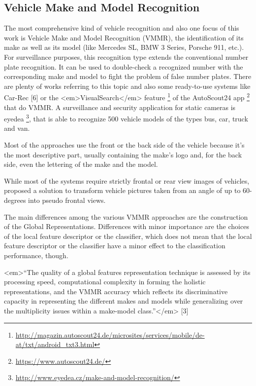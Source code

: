 \subsection{Vehicle Make and Model Recognition}\label{sec:vmmrStateOfTheArt}
The most comprehensive kind of vehicle recognition and also one focus of this work is Vehicle Make and Model Recognition (VMMR), the identification of its make as well as its model (like Mercedes SL, BMW 3 Series, Porsche 911, etc.). For surveillance purposes, this recognition type extends the conventional number plate recognition. It can be used to double-check a recognized number with the corresponding make and model to fight the problem of false number plates. There are plenty of works referring to this topic and also some ready-to-use systems like Car-Rec [6] or the <em>VisualSearch</em> feature \footnote{\url{http://magazin.autoscout24.de/microsites/services/mobile/de-at/txt/android_txt3.html}} of the AutoScout24 app \footnote{\url{https://www.autoscout24.de/}} that do VMMR.
A surveillance and security application for static cameras is eyedea \footnote{\url{http://www.eyedea.cz/make-and-model-recognition/}}, that is able to recognize 500 vehicle models of the types bus, car, truck and van.

Most of the approaches use the front or the back side of the vehicle because it’s the most descriptive part, usually containing the make’s logo and, for the back side, even the lettering of the make and the model.

While most of the systems require strictly frontal or rear view images of vehicles, \citeauthor{shinozuka2013vehicle} proposed a solution to transform vehicle pictures taken from an angle of up to 60-degrees into pseudo frontal views.

The main differences among the various VMMR approaches are the construction of the Global Representations. Differences with minor importance are the choices of the local feature descriptor or the classifier, which does not mean that the local feature descriptor or the classifier have a minor effect to the classification performance, though.

<em>“The quality of a global features representation technique is assessed by its processing speed, computational complexity in forming the holistic representations, and the VMMR accuracy which reflects its discriminative capacity in representing the different makes and models while generalizing over the multiplicity issues within a make-model class.”</em> [3]

